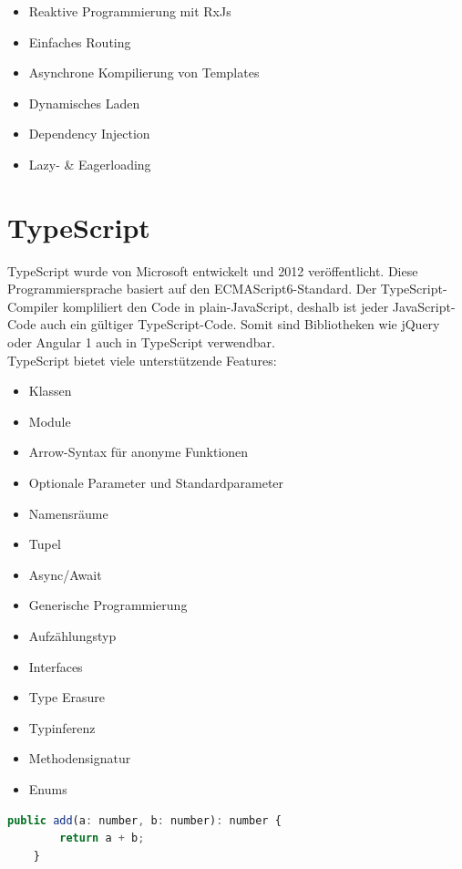 \begin{itemize}
	\item Reaktive Programmierung mit RxJs
	\item Einfaches Routing
	\item Asynchrone Kompilierung von Templates
	\item Dynamisches Laden
	\item Dependency Injection
	\item Lazy- \& Eagerloading
\end{itemize}

\section{TypeScript}
TypeScript wurde von Microsoft entwickelt und 2012 veröffentlicht. Diese Programmiersprache basiert auf den ECMAScript6-Standard. Der TypeScript-Compiler kompliliert den Code in plain-JavaScript, deshalb ist jeder JavaScript-Code auch ein gültiger TypeScript-Code. Somit sind Bibliotheken wie jQuery oder Angular 1 auch in TypeScript verwendbar. \autocite{wikiTypeScript} \\

TypeScript bietet viele unterstützende Features:

\begin{itemize}
	\item Klassen
	\item Module
	\item Arrow-Syntax für anonyme Funktionen
	\item Optionale Parameter und Standardparameter
	\item Namensräume
	\item Tupel
	\item Async/Await
	\item Generische Programmierung
	\item Aufzählungstyp
	\item Interfaces
	\item Type Erasure
	\item Typinferenz
	\item Methodensignatur
	\item Enums
\end{itemize}

\begin{lstlisting}[caption={TypeScript-Beispiel Function}, language=JavaScript]
	public add(a: number, b: number): number {
		return a + b;
	}
\end{lstlisting}


